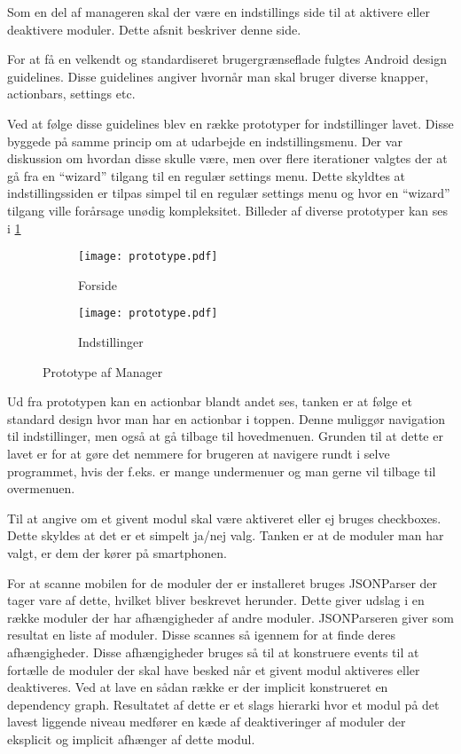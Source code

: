 Som en del af manageren skal der være en indstillings side til at aktivere eller deaktivere moduler. Dette afsnit beskriver denne side.

For at få en velkendt og standardiseret brugergrænseflade fulgtes Android design guidelines.
Disse guidelines angiver hvornår man skal bruger diverse knapper, actionbars, settings etc.
\citep{androiddesign}

Ved at følge disse guidelines blev en række prototyper for indstillinger lavet.
Disse byggede på samme princip om at udarbejde en indstillingsmenu.
Der var diskussion om hvordan disse skulle være, men over flere iterationer valgtes der at gå fra en ``wizard'' tilgang til en regulær settings menu.
Dette skyldtes at indstillingssiden er tilpas simpel til en regulær settings menu og hvor en ``wizard'' tilgang ville forårsage unødig kompleksitet.
Billeder af diverse prototyper kan ses i \cref{fig:prototype-manager}

\begin{figure}[!h]
	\centering
	\begin{subfigure}[b]{0.45\textwidth}
			\texttt{[image: prototype.pdf]}
			\caption{Forside}
	\end{subfigure}
	\begin{subfigure}[b]{0.45\textwidth}
			\texttt{[image: prototype.pdf]}
			\caption{Indstillinger}
	\end{subfigure}
	\caption{Prototype af Manager}
	\label{fig:prototype-manager}
\end{figure}


Ud fra prototypen kan en actionbar blandt andet ses, tanken er at følge et standard design hvor man har en actionbar i toppen.
Denne muliggør navigation til indstillinger, men også at gå tilbage til hovedmenuen.
Grunden til at dette er lavet er for at gøre det nemmere for brugeren at navigere rundt i selve programmet, hvis der f.eks. er mange undermenuer og man gerne vil tilbage til overmenuen.

Til at angive om et givent modul skal være aktiveret eller ej bruges checkboxes.
Dette skyldes at det er et simpelt ja/nej valg. 
Tanken er at de moduler man har valgt, er dem der kører på smartphonen.

For at scanne mobilen for de moduler der er installeret bruges JSONParser der tager vare af dette, hvilket bliver beskrevet herunder.
Dette giver udslag i en række moduler der har afhængigheder af andre moduler.
JSONParseren giver som resultat en liste af moduler. Disse scannes så igennem for at finde deres afhængigheder.
Disse afhængigheder bruges så til at konstruere events til at fortælle de moduler der skal have besked når et givent modul aktiveres eller deaktiveres.
Ved at lave en sådan række er der implicit konstrueret en dependency graph.
Resultatet af dette er et slags hierarki hvor et modul på det lavest liggende niveau medfører en kæde af deaktiveringer af moduler der eksplicit og implicit afhænger af dette modul.
